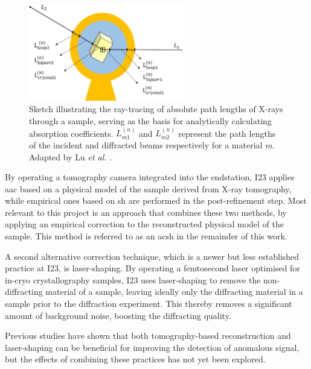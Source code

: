 \begin{figure}
    \centering
    \includegraphics[width = 0.6\textwidth]{images/absorption correction diagram.jpg}
    \caption{Sketch illustrating the ray-tracing of absolute path lengths of X-rays through a sample, serving as the basis for analytically calculating absorption coefficients. $L_{m1}^{(n)}$ and $L_{m2}^{(n)}$ represent the path lengths of the incident and diffracted beams respectively for a material $m$. Adapted by Lu \textit{et al.} \cite{Lu}.
    }
    \label{fig:analytical correction model}
\end{figure}

By operating a tomography camera integrated into the endstation, I23 applies \ac{aac} based on a physical model of the sample derived from X-ray tomography, while empirical ones based on \ac{sh} are performed in the post-refinement step. Most relevant to this project is an approach that combines these two methods, by applying an empirical correction to the reconstructed physical model of the sample. This method is referred to as an \ac{acsh} in the remainder of this work. %

A second alternative correction technique, which is a newer but less established practice at I23, is laser-shaping. By operating a femtosecond laser optimised for in-cryo crystallography samples, I23 uses laser-shaping to remove the non-diffracting material of a sample, leaving ideally only the diffracting material in a sample prior to the diffraction experiment. This thereby removes a significant amount of background noise, boosting the diffracting quality.

Previous studies have shown that both tomography-based reconstruction and laser-shaping can be beneficial for improving the detection of anomalous signal, but the effects of combining these practices has not yet been explored.

